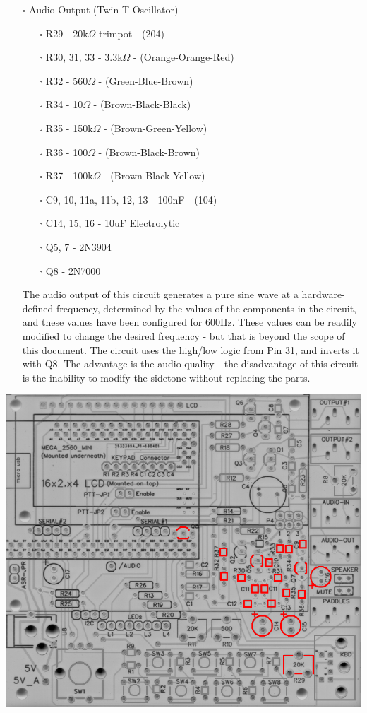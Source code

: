 \documentclass[11pt]{article}
\begin{document}
\newpage
\begin{itemize}
\item[{$\square$}] Audio Output (Twin T Oscillator)
\begin{itemize}
\item[{$\square$}] R29 - 20k\(\Omega\) trimpot - (204)
\item[{$\square$}] R30, 31, 33 - 3.3k\(\Omega\) - (Orange-Orange-Red)
\item[{$\square$}] R32 - 560\(\Omega\) - (Green-Blue-Brown)
\item[{$\square$}] R34 - 10\(\Omega\) - (Brown-Black-Black)
\item[{$\square$}] R35 - 150k\(\Omega\) - (Brown-Green-Yellow)
\item[{$\square$}] R36 - 100\(\Omega\) - (Brown-Black-Brown)
\item[{$\square$}] R37 - 100k\(\Omega\) - (Brown-Black-Yellow)
\item[{$\square$}] C9, 10, 11a, 11b, 12, 13 - 100nF - (104)
\item[{$\square$}] C14, 15, 16 - 10uF Electrolytic
\item[{$\square$}] Q5, 7 - 2N3904
\item[{$\square$}] Q8 - 2N7000
\end{itemize}

The audio output of this circuit generates a pure sine wave at a hardware-defined frequency, determined by the values of the components in the circuit, and these values have been configured for 600Hz.  These values can be readily modified to change the desired frequency - but that is beyond the scope of this document.  The circuit uses the high/low logic from Pin 31, and inverts it with Q8.  The advantage is the audio quality - the disadvantage of this circuit is the inability to modify the sidetone without replacing the parts.
\end{itemize}
\begin{center}
\includegraphics[width=.9\linewidth]{../png/3.3/pcb-top-audio-output-twin-t.png}
\end{center}
\end{document}
